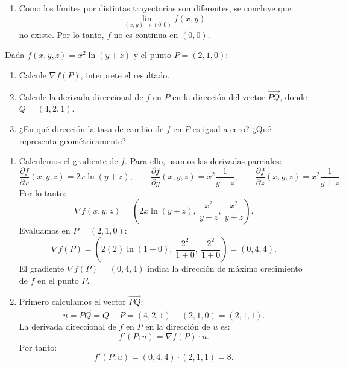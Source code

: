 \documentclass[11pt,respuestas,a4]{aleph-examen}
\begin{document}
\begin{preguntas}
\begin{respuesta}
\begin{enumerate}
    \item  Como los límites por distintas trayectorias son diferentes, se concluye que:
    \[
        \lim_{(x,y)\to(0,0)} f(x,y)
    \]
    no existe. Por lo tanto, \(f\) no es continua en \((0,0)\).\qedhere
\end{enumerate}
\end{respuesta}

\item
Dada $f(x,y,z) = x^2 \ln(y+z)$ y el punto $P=(2, 1, 0)$:
\begin{enumerate}
    \item Calcule $\nabla f(P)$, interprete el resultado.
    \item Calcule la derivada direccional de $f$ en $P$ en la dirección del vector $\overrightarrow{PQ}$, donde $Q=(4,2,1)$.
    \item ¿En qué dirección la tasa de cambio de $f$ en $P$ es igual a cero? ¿Qué representa geométricamente?
\end{enumerate}

\begin{respuesta}
\begin{enumerate}
    \item Calculemos el gradiente de \(f\). Para ello, usamos las derivadas parciales:
    \[
        \frac{\partial f}{\partial x}(x,y,z)
        =
        2x\ln(y+z),
        \qquad
        \frac{\partial f}{\partial y}(x,y,z)
        =
        x^2\frac{1}{y+z},
        \qquad
        \frac{\partial f}{\partial z}(x,y,z)
        =
        x^2\frac{1}{y+z}.
    \]
    Por lo tanto:
    \[
        \nabla f(x,y,z)
        =
        \left(
            2x\ln(y+z),\ 
            \frac{x^2}{y+z},\ 
            \frac{x^2}{y+z}
        \right).
    \]
    Evaluamos en \(P=(2,1,0)\):
    \[
        \nabla f(P)
        =
        \left(
            2(2)\ln(1+0),\ 
            \frac{2^2}{1+0},\ 
            \frac{2^2}{1+0}
        \right)
        =
        (0,4,4).
    \]
    El gradiente \(\nabla f(P)=(0,4,4)\) indica la dirección de máximo crecimiento de \(f\) en el punto \(P\).

    \item Primero calculamos el vector \(\overrightarrow{PQ}\):
    \[
        u = \overrightarrow{PQ}
        =
        Q-P
        =
        (4,2,1)-(2,1,0)
        =
        (2,1,1).
    \]
    La derivada direccional de \(f\) en \(P\) en la dirección de \(u\) es:
    \[
        f'(P; u)
        =
        \nabla f(P)\cdot u.
    \]
    Por tanto:
    \[
        f'(P; u)
        =
        (0,4,4)\cdot(2,1,1)
        =
        8.
    \]


\end{enumerate}
\end{respuesta}
\end{preguntas}
\end{document}
